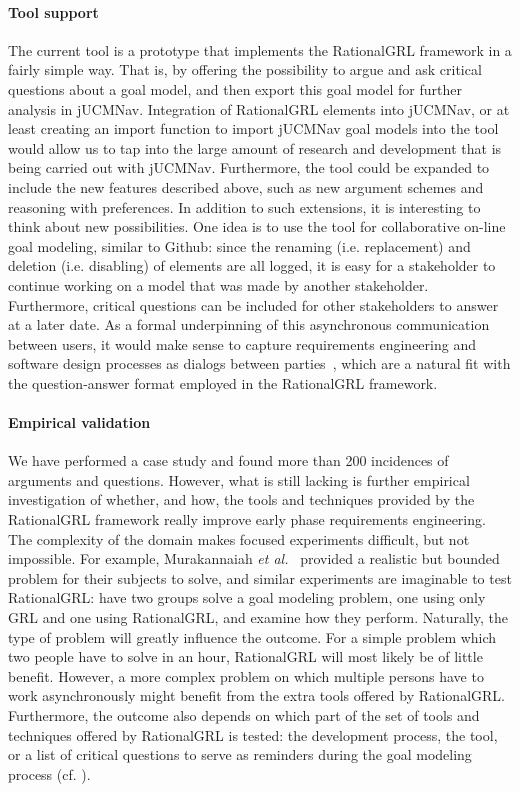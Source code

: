\paragraph{Tool support}
The current tool is a prototype that implements the RationalGRL framework in a fairly simple way. That is, by offering the possibility to argue and ask critical questions about a goal model, and then export this goal model for further analysis in jUCMNav. Integration of RationalGRL elements into jUCMNav, or at least creating an import function to import jUCMNav goal models into the tool would allow us to tap into the large amount of research and development that is being carried out with jUCMNav. Furthermore, the tool could be expanded to include the new features described above, such as new argument schemes and reasoning with preferences. In addition to such extensions, it is interesting to think about new possibilities. One idea is to use the tool for collaborative on-line goal modeling, similar to Github: since the renaming (i.e. replacement) and deletion (i.e. disabling) of elements are all logged, it is easy for a stakeholder to continue working on a model that was made by another stakeholder. Furthermore, critical questions can be included for other stakeholders to answer at a later date. As a formal underpinning of this asynchronous communication between users, it would make sense to capture requirements engineering and software design processes as dialogs between parties~\cite{finkelstein1989multiparty,BlackEtal2013}, which are a natural fit with the question-answer format employed in the RationalGRL framework. 

\paragraph{Empirical validation}
We have performed a case study and found more than 200 incidences of arguments and questions. However, what is still lacking is further empirical investigation of whether, and how, the tools and techniques provided by the RationalGRL framework really improve early phase requirements engineering. The complexity of the domain makes focused experiments difficult, but not impossible. For example, Murakannaiah \emph{et al.}~\cite{murukannaiah2015} provided a realistic but bounded problem for their subjects to solve, and similar experiments are imaginable to test RationalGRL: have two groups solve a goal modeling problem, one using only GRL and one using RationalGRL, and examine how they perform. Naturally, the type of problem will greatly influence the outcome. For a simple problem which two people have to solve in an hour, RationalGRL will most likely be of little benefit. However, a more complex problem on which multiple persons have to work asynchronously might benefit from the extra tools offered by RationalGRL. Furthermore, the outcome also depends on which part of the set of tools and techniques offered by RationalGRL is tested: the development process, the tool, or a list of critical questions to serve as reminders during the goal modeling process (cf. \cite{SchriekEtal2016}).

